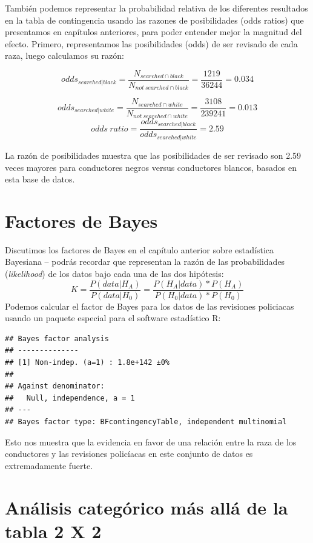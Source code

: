 \documentclass[
  12pt,
]{book}
\begin{document}
También podemos representar la probabilidad relativa de los diferentes resultados en la tabla de contingencia usando las razones de posibilidades (odds ratios) que presentamos en capítulos anteriores, para poder entender mejor la magnitud del efecto. Primero, representamos las posibilidades (odds) de ser revisado de cada raza, luego calculamos su razón:

\[
odds_{searched|black} = \frac{N_{searched\cap black}}{N_{not\ searched\cap black}} = \frac{1219}{36244} = 0.034
\]

\[
odds_{searched|white} = \frac{N_{searched\cap white}}{N_{not\ searched\cap white}} = \frac{3108}{239241} = 0.013
\]
\[
odds\ ratio = \frac{odds_{searched|black}}{odds_{searched|white}} = 2.59
\]

La razón de posibilidades muestra que las posibilidades de ser revisado son 2.59 veces mayores para conductores negros versus conductores blancos, basados en esta base de datos.

\hypertarget{factores-de-bayes}{%
\section{Factores de Bayes}\label{factores-de-bayes}}

Discutimos los factores de Bayes en el capítulo anterior sobre estadística Bayesiana -- podrás recordar que representan la razón de las probabilidades (\emph{likelihood}) de los datos bajo cada una de las dos hipótesis:
\[ 
K = \frac{P(data|H_A)}{P(data|H_0)} = \frac{P(H_A|data)*P(H_A)}{P(H_0|data)*P(H_0)}
\]
Podemos calcular el factor de Bayes para los datos de las revisiones policiacas usando un paquete especial para el software estadístico R:

\begin{verbatim}
## Bayes factor analysis
## --------------
## [1] Non-indep. (a=1) : 1.8e+142 ±0%
## 
## Against denominator:
##   Null, independence, a = 1 
## ---
## Bayes factor type: BFcontingencyTable, independent multinomial
\end{verbatim}

Esto nos muestra que la evidencia en favor de una relación entre la raza de los conductores y las revisiones policíacas en este conjunto de datos es extremadamente fuerte.

\hypertarget{anuxe1lisis-categuxf3rico-muxe1s-alluxe1-de-la-tabla-2-x-2}{%
\section{Análisis categórico más allá de la tabla 2 X 2}\label{anuxe1lisis-categuxf3rico-muxe1s-alluxe1-de-la-tabla-2-x-2}}
\end{document}
